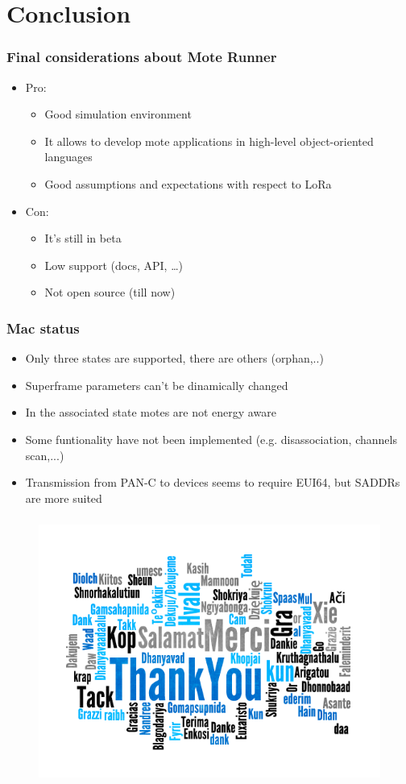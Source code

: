 \section{Conclusion} 

\begin{frame}[fragile]
  \frametitle{Final considerations about Mote Runner}
   \begin{itemize}
    \item Pro:
    \begin{itemize}
      \item Good simulation environment
      \item It allows to develop mote applications in high-level object-oriented languages
      \item Good assumptions and expectations with respect to LoRa
    \end{itemize}
    \item Con:
    \begin{itemize}
      \item It's still in beta
      \item Low support (docs, API, \dots)
      \item Not open source (till now)
    \end{itemize}
  \end{itemize}
\end{frame}

\begin{frame}[fragile]
  \frametitle{Mac status}
  \begin{itemize}
    \item Only three states are supported, there are others (orphan,..)
    \item Superframe parameters can't be dinamically changed
    \item In the associated state motes are not energy aware
    \item Some funtionality have not been implemented (e.g. disassociation, channels scan,...)
    \item Transmission from PAN-C to devices seems to require EUI64, but SADDRs are more suited
  \end{itemize}

\end{frame}


\begin{frame}[fragile]
  \frametitle{}
 
  \begin{figure}
   \centering
  \includegraphics[width=\textwidth]{img/thankyou.png}
   \end{figure}

  
\end{frame}
